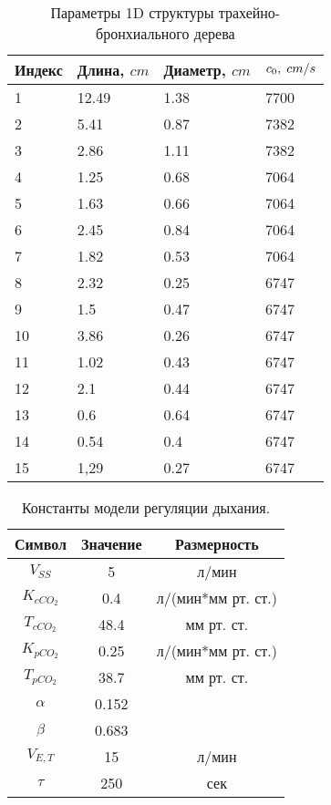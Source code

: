 \begin{table}
    \caption{Параметры 1D структуры трахейно-бронхиального дерева}
    \centering
    \begin{tabular}{|p{0.7in}|p{1.5in}|p{1.5in}|p{1.0in}|} \hline 
    \textbf{Индекс} & \textbf{Длина, }$cm$ & \textbf{Диаметр, }$cm$\textbf{} & $c_{0} ,\; {cm\mathord{\left/ {\vphantom {cm s}} \right. \kern-\nulldelimiterspace} s} $\textbf{} \\ \hline 
    1 & 12.49 & 1.38 & 7700 \\ \hline 
    2 & 5.41 & 0.87 & 7382 \\ \hline 
    3 & 2.86 & 1.11 & 7382 \\ \hline 
    4 & 1.25 & 0.68 & 7064 \\ \hline 
    5 & 1.63 & 0.66 & 7064 \\ \hline 
    6 & 2.45 & 0.84 & 7064 \\ \hline 
    7 & 1.82 & 0.53 & 7064 \\ \hline 
    8 & 2.32 & 0.25 & 6747 \\ \hline 
    9 & 1.5 & 0.47 & 6747 \\ \hline 
    10 & 3.86 & 0.26 & 6747 \\ \hline 
    11 & 1.02 & 0.43 & 6747 \\ \hline 
    12 & 2.1 & 0.44 & 6747 \\ \hline 
    13 & 0.6 & 0.64 & 6747 \\ \hline 
    14 & 0.54 & 0.4 & 6747 \\ \hline 
    15 & 1,29 & 0.27 & 6747 \\ \hline 
    \end{tabular}
    \label{tab:lang1d}
\end{table}

\begin{table}[!ht]
	\centering
	\caption{Константы модели регуляции дыхания.}
	\medskip
	\label{tab:params_reg}
	\begin{tabular}{|c|c|c|}
		\hline
		Символ & Значение & Размерность \\
		\hline
		\(V_{SS}\)& 5 & л\slash мин \\
		\hline
		\(K_{cCO_{2}}\) & 0.4& л\slash (мин*мм рт. ст.) \\
		\hline
		\(T_{cCO_{2}}\) & 48.4 & мм рт. ст. \\
		\hline
		\(K_{pCO_{2}}\) & 0.25 & л\slash (мин*мм рт. ст.) \\
		\hline
		\(T_{pCO_{2}}\) & 38.7 & мм рт. ст. \\
		\hline
		\(\alpha\) & 0.152&  \\
		\hline
		\(\beta\) & 0.683 &  \\
		\hline
		\(V_{E,T}\) & 15& л\slash мин\\
		\hline
		\(\tau\) & 250 & сек\\
		\hline
	\end{tabular}
\end{table}

